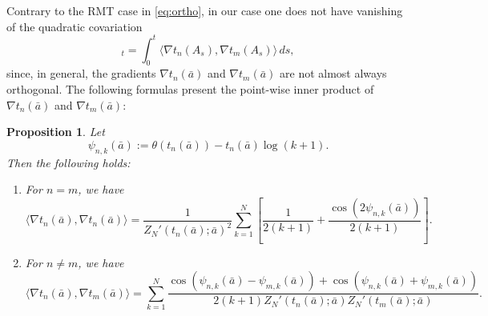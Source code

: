 \documentclass[12pt,reqno]{amsart}
\theoremstyle{plain}
\newtheorem{prop}{Proposition}[section]
\theoremstyle{definition}
\theoremstyle{remark}
\begin{document}
Contrary to the RMT case in \eqref{eq:ortho}, in our case one does not have vanishing of the quadratic covariation 
\begin{equation}
[\beta^{(n)}, \beta^{(m)}]_t = \int_0^t \langle \nabla t_n(A_s), \nabla t_m(A_s) \rangle \, ds,
\end{equation}
since, in general, the gradients \( \nabla t_n(\bar{a}) \) and \( \nabla t_m(\bar{a}) \) are not almost always orthogonal. The following formulas present the point-wise inner product of \( \nabla t_n(\bar{a} ) \) and \( \nabla t_m(\bar{a}) \): 
\begin{prop} \label{prop:gradient_inner_products}
Let
\begin{equation}
\psi_{n,k}(\bar{a}) := \theta(t_n(\bar{a})) - t_n(\bar{a}) \log(k+1).
\end{equation} 
Then the following holds:
\begin{enumerate}
    \item For \( n = m \), we have
    \begin{equation}
    \label{eq:nn}
    \langle \nabla t_n(\bar{a}), \nabla t_n(\bar{a}) \rangle 
    = 
    \frac{1}{Z_N'(t_n(\bar{a}); \bar{a})^2} \sum_{k=1}^N  \left[ \frac{1}{2(k+1)}+
    \frac{ \cos(2\psi_{n,k}(\bar{a}))}{2(k+1)} \right ].
    \end{equation}
    
    \item For \( n \ne m \), we have
    \begin{equation}
    \langle \nabla t_n(\bar{a}), \nabla t_m(\bar{a}) \rangle 
    = 
    \sum_{k=1}^N \frac{\cos(\psi_{n,k}(\bar{a}) - \psi_{m,k}(\bar{a})) + \cos(\psi_{n,k}(\bar{a}) + \psi_{m,k}(\bar{a}))}{2(k+1)Z_N'(t_n(\bar{a}); \bar{a}) Z_N'(t_m(\bar{a}); \bar{a})}.
    \end{equation}
\end{enumerate}
\end{prop}
\end{document}
